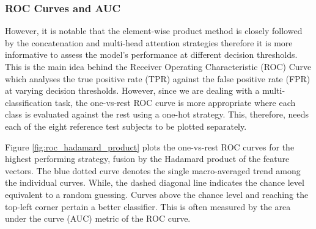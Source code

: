 \documentclass{mpaper}
\begin{document}
\subsubsection{ROC Curves and AUC}
However, it is notable that the element-wise product method is closely followed by the concatenation and multi-head attention strategies therefore it is more informative to assess the model's performance at different decision thresholds. This is the main idea behind the Receiver Operating Characteristic (ROC) Curve which analyses the true positive rate (TPR) against the false positive rate (FPR) at varying decision thresholds. However, since we are dealing with a multi-classification task, the one-vs-rest ROC curve is more appropriate where each class is evaluated against the rest using a one-hot strategy. This, therefore, needs each of the eight reference test subjects to be plotted separately. 

Figure \ref{fig:roc_hadamard_product} plots the one-vs-rest ROC curves for the highest performing strategy, fusion by the Hadamard product of the feature vectors. The blue dotted curve denotes the single macro-averaged trend among the individual curves. While, the dashed diagonal line indicates the chance level equivalent to a random guessing. Curves above the chance level and reaching the top-left corner pertain a better classifier. This is often measured by the area under the curve (AUC) metric of the ROC curve. 
\end{document}
